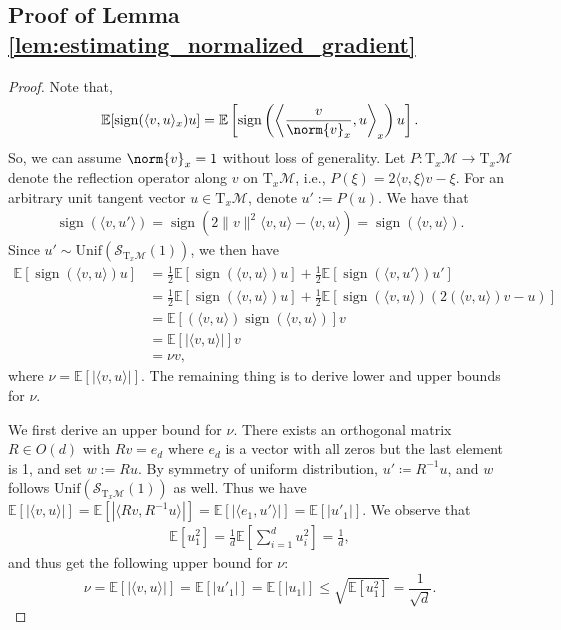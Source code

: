 \documentclass{article}
\newcommand{\pert}{\nu}
\theoremstyle{plain}
\theoremstyle{definition}
\theoremstyle{remark}
\begin{document}
\subsection{Proof of Lemma \ref{lem:estimating_normalized_gradient} }\label{pf:estimating_normalized_gradient}
\begin{proof}
Note that, 
\begin{align*}
    \mathbb{E}[\operatorname{sign}(\langle v,u\rangle_x)u]=\mathbb{E}\left[\operatorname{sign}\left(\left\langle \frac{v}{\norm{v}_x},u\right\rangle_x\right)u\right].
\end{align*}
So, we can assume $\norm{v}_x=1$ without loss of generality. 
Let $P:\mathrm{T}_x\mathcal{M}\rightarrow \mathrm{T}_x\mathcal{M}$ denote the reflection operator along $v$ on $\mathrm{T}_x\mathcal{M}$, i.e., $P(\xi)= 2\langle v,\xi\rangle v-\xi$. For an arbitrary unit tangent vector $u\in\mathrm{T}_x\mathcal{M}$, denote $u':=P(u)$. We have that 
\begin{align*}
\operatorname{sign}( \langle v,u'\rangle) = \operatorname{sign} \left( 2 \|v\|^2 \langle v,u \rangle - \langle v,u \rangle \right) = \operatorname{sign}(\langle v,u\rangle).
\end{align*}
Since $u'\sim \mathrm{Unif}(\mathcal{S}_{\mathrm{T}_x\mathcal{M}}(1))$, we then have
\begin{align*}
\mathbb{E}[\operatorname{sign}(\langle v,u\rangle) u] 
&= \frac{1}{2} \mathbb{E}[\operatorname{sign}(\langle v,u\rangle) u] + \frac{1}{2} \mathbb{E}[\operatorname{sign}(\langle v,u'\rangle) u'] \\
&= \frac{1}{2} \mathbb{E}[\operatorname{sign}(\langle v,u\rangle) u] + \frac{1}{2} \mathbb{E}[\operatorname{sign}(\langle v,u\rangle)(2 (\langle v,u\rangle) v-u)] \\
&= \mathbb{E}[(\langle v,u\rangle) \operatorname{sign}(\langle v,u\rangle)] v\\
&=\mathbb{E}[|\langle v,u\rangle|]v\\
&=\pert v, %
\end{align*}
where $\pert = \mathbb{E}[|\langle v,u\rangle|]$.
The remaining thing is to derive lower and upper bounds for $\pert$.


We first derive an upper bound for $\nu$. There exists an orthogonal matrix $R\in O(d)$ with $Rv=e_d$ where $e_d$ is a vector with all zeros but the last element is 1, and set $w:=Ru$. By symmetry of uniform distribution, $u'\coloneqq R^{-1}u$, and $w$ follows $\mathrm{Unif}(\mathcal{S}_{\mathrm{T}_x\mathcal{M}}(1))$ as well. Thus we have
$\mathbb{E}[|\langle v,u\rangle|]=\mathbb{E}[|\langle Rv,R^{-1}u\rangle|]=\mathbb{E}[|\langle e_1,u'\rangle|]=\mathbb{E}[|u'_1|]$.
We observe that 
\begin{align*}
\mathbb{E}[u_1^2] = \frac{1}{d} \mathbb{E}\left[\sum_{i=1}^d u_i^2\right] = \frac{1}{d},
\end{align*}
and thus get the following upper bound for $\pert$:
\begin{equation}\label{eq:nu-upper-bound}
\nu=\mathbb{E}[|\langle v,u\rangle|]=\mathbb{E}[|u'_1|]=\mathbb{E}[|u_1|] \leq \sqrt{\mathbb{E}[u_1^2]} = \frac{1}{\sqrt{d}}.
\end{equation}


\end{proof}
\end{document}
